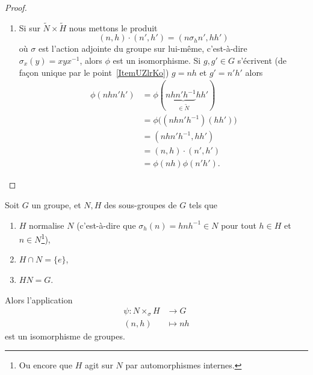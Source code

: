 \begin{proof}
\begin{enumerate}
		\item
		      Si sur \( \tilde N\times \tilde H\) nous mettons le produit
		      \begin{equation}
			      (n,h)\cdot(n',h')=(n\sigma_hn',hh')
		      \end{equation}
		      où \( \sigma\) est l'action adjointe du groupe sur lui-même, c'est-à-dire \( \sigma_x(y)=xyx^{-1}\), alors \( \phi\) est un isomorphisme. Si \( g,g'\in G\) s'écrivent (de façon unique par le point~\ref{ItemUZlrKo}) \( g=nh\) et \( g'=n'h'\) alors
		      \begin{subequations}
			      \begin{align}
				      \phi(nhn'h') & =\phi(n\underbrace{hn'h^{-1}}_{\in \tilde N}hh') \\
				                   & =\phi\big( (nhn'h^{-1})(hh') \big)               \\
				                   & =(nhn'h^{-1},hh')                                \\
				                   & =(n,h)\cdot(n',h')                               \\
				                   & =\phi(nh)\phi(n'h').
			      \end{align}
		      \end{subequations}
	\end{enumerate}
\end{proof}

\begin{corollary}\label{CoroGohOZ}
	Soit \( G\) un groupe, et \( N,H\) des sous-groupes de \( G\) tels que
	\begin{enumerate}
		\item
		      \( H\) normalise \( N\) (c'est-à-dire que \( \sigma_h(n)= hnh^{-1}\in N\) pour tout \( h\in H\) et \( n\in N\)\footnote{Ou encore que \( H\) agit sur \( N\) par automorphismes internes.}),
		\item
		      \( H\cap N=\{ e \}\),
		\item
		      \( HN=G\).
	\end{enumerate}
	Alors l'application
	\begin{equation}
		\begin{aligned}
			\psi\colon N\times_{\sigma}H & \to G      \\
			(n,h)                        & \mapsto nh
		\end{aligned}
	\end{equation}
	est un isomorphisme de groupes.
\end{corollary}

